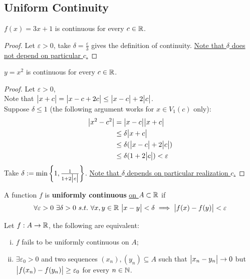 \documentclass[11pt]{article}
\begin{document}
	\subsection{Uniform Continuity}
	\begin{example}
		$f(x) = 3x + 1$ is continuous for every $c \in \mathbb{R}$.
	\end{example}
	
	\begin{proof}
		Let $\varepsilon > 0$, take $\delta = \frac{\varepsilon}{3}$ gives the definition of continuity. \ul{Note that $\delta$ does not depend on particular $c$.}
	\end{proof}
	
	\begin{example}
		$y = x^2$ is continuous for every $c \in \mathbb{R}$.
	\end{example}
	
	\begin{proof}
		Let $\varepsilon > 0$, \\
		Note that $\big \vert {x+c} \big \vert = \big \vert {x-c+2c} \big \vert \leq \big \vert {x-c} \big \vert + 2\big \vert {c} \big \vert$. \\
		Suppose $\delta \leq 1$ (the following argument works for $x \in V_1(c)$ only):
		\begin{align}
			\big \vert {x^2 - c^2} \big \vert &= \big \vert {x-c} \big \vert\big \vert {x+c} \big \vert \\
			&\leq \delta \big \vert {x+c} \big \vert \\
			&\leq \delta (\big \vert {x-c} \big \vert + 2\big \vert {c} \big \vert) \\
			&\leq \delta(1 + 2 \big \vert {c} \big \vert) < \varepsilon
		\end{align}
		Take $\delta := \min \left\{1, \frac{1}{1 + 2 \big \vert {c} \big \vert} \right\}$. \ul{Note that $\delta$ depends on particular realization $c$.}
	\end{proof}
	
	\begin{definition}
		A function $f$ is \textbf{uniformly continuous} \ul{on $A \subset \mathbb{R}$} if 
		\begin{align}
			\forall \varepsilon > 0\ \exists \delta > 0\ s.t.\ \forall x, y \in \R\ \abs{x - y} < \delta \implies \abs{f(x) - f(y)} < \varepsilon
		\end{align}
	\end{definition}
	
	\begin{theorem}
		Let $f: A \to \mathbb{R}$, the following are equivalent:
		\begin{enumerate}[(i)]
			\item $f$ fails to be uniformly continuous on $A$;
			\item $\exists \varepsilon_0 > 0$ and two sequences $(x_n), (y_n) \subseteq A$ such that $\big \vert {x_n - y_n} \big \vert \to 0$ but $\big \vert {f(x_n) - f(y_n)} \big \vert \geq \varepsilon_0$ for every $n \in \mathbb{N}$.
		\end{enumerate}
	\end{theorem}
\end{document}
